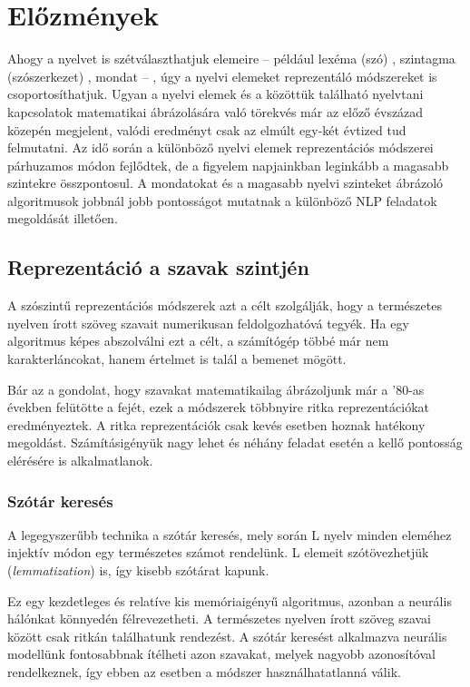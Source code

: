 \chapter{Előzmények}
\label{ch:related_work}

Ahogy a nyelvet is szétválaszthatjuk elemeire – például lexéma (szó) , szintagma (szószerkezet) , mondat – , úgy a nyelvi elemeket reprezentáló módszereket is csoportosíthatjuk. Ugyan a nyelvi elemek és a közöttük található nyelvtani kapcsolatok matematikai ábrázolására való törekvés már az előző évszázad közepén megjelent, valódi eredményt csak az elmúlt egy-két évtized tud felmutatni. Az idő során a különböző nyelvi elemek reprezentációs módszerei párhuzamos módon fejlődtek, de a figyelem napjainkban leginkább a magasabb szintekre összpontosul. A mondatokat és a magasabb nyelvi szinteket ábrázoló algoritmusok jobbnál jobb pontosságot mutatnak a különböző NLP feladatok megoldását illetően.


\section{Reprezentáció a szavak szintjén}

A szószintű reprezentációs módszerek azt a célt szolgálják, hogy a természetes nyelven írott szöveg szavait numerikusan feldolgozhatóvá tegyék. Ha egy algoritmus képes abszolválni ezt a célt, a számítógép többé már nem karakterláncokat, hanem értelmet is talál a bemenet mögött.

Bár az a gondolat, hogy szavakat matematikailag ábrázoljunk már a '80-as években felütötte a fejét, ezek a módszerek többnyire ritka reprezentációkat eredményeztek. A ritka reprezentációk csak kevés esetben hoznak hatékony megoldást. Számításigényük nagy lehet és néhány feladat esetén a kellő pontosság elérésére is alkalmatlanok.

\subsection{Szótár keresés}

A legegyszerűbb technika a szótár keresés, mely során L nyelv minden eleméhez injektív módon egy természetes számot rendelünk. L elemeit szótövezhetjük (\textit{lemmatization}) is, így kisebb szótárat kapunk.

Ez egy kezdetleges és relatíve kis memóriaigényű algoritmus, azonban a neurális hálónkat könnyedén félrevezetheti. A természetes nyelven írott szöveg szavai között csak ritkán találhatunk rendezést. A szótár keresést alkalmazva neurális modellünk fontosabbnak ítélheti  azon szavakat, melyek nagyobb azonosítóval rendelkeznek, így ebben az esetben a módszer használhatatlanná válik.

